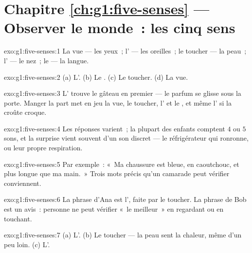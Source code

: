 \section*{Chapitre \ref{ch:g1:five-senses} --- Observer le monde~: les cinq sens}

\begin{solution}{exo:g1:five-senses:1}
La vue --- les yeux~; l' --- les oreilles~; le toucher --- la
peau~; l' --- le nez~; le  --- la langue.
\end{solution}

\begin{solution}{exo:g1:five-senses:2}
(a) L'. (b) Le . (c) Le toucher. (d) La vue.
\end{solution}

\begin{solution}{exo:g1:five-senses:3}
L' trouve le gâteau en premier --- le parfum se glisse sous la
porte. Manger la part met en jeu la vue, le toucher, l' et le
, et même l' si la croûte croque.
\end{solution}

\begin{solution}{exo:g1:five-senses:4}
Les réponses varient~; la plupart des enfants comptent $4$ ou $5$
sons, et la surprise vient souvent d'un son discret --- le
réfrigérateur qui ronronne, ou leur propre respiration.
\end{solution}

\begin{solution}{exo:g1:five-senses:5}
Par exemple~: «~Ma chaussure est bleue, en caoutchouc, et plus longue
que ma main.~» Trois mots précis qu'un camarade peut vérifier
conviennent.
\end{solution}

\begin{solution}{exo:g1:five-senses:6}
La phrase d'Ana est l', faite par le toucher. La phrase de
Bob est un avis~: personne ne peut vérifier «~le meilleur~» en
regardant ou en touchant.
\end{solution}

\begin{solution}{exo:g1:five-senses:7}
(a) L'. (b) Le toucher --- la peau sent la chaleur, même d'un
peu loin. (c) L'.
\end{solution}

